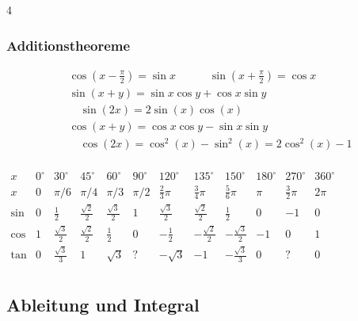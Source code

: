\documentclass[6pt,a4paper]{scrartcl}
\newcommand{\enbrace}[1]{\ensuremath{\left(#1\right)}}
\begin{document}
\begin{multicols*}{4}
\begin{sectionbox}
		\subsubsection{Additionstheoreme}
		\begin{eqnarray*}
			& \cos \enbrace{x - \frac{\pi}{2}} = \sin x \qquad \quad \sin \enbrace{x + \frac{\pi}{2}} = \cos x \\
			& \sin \enbrace{x + y} = \sin x \cos y + \cos x \sin y \\
			& \quad \sin (2x) = 2 \sin (x) \cos (x)        \\
			& \cos (x + y) = \cos x \cos y - \sin x \sin y \\
			& \quad \cos (2x) = \cos^2 (x) - \sin^2 (x) = 2\cos^2 (x) - 1\\
		\end{eqnarray*}
	\end{sectionbox}
	\hspace{-20pt}
	\scalebox{0.75}
	{
		$\begin{array}{c|c|c|c|c|c|c|c|c|c|c|c}
				x    & 0^{\circ} & 30^{\circ}         & 45^{\circ}         & 60^{\circ}        & 90^{\circ} & 120^{\circ}       & 135^{\circ}         & 150^{\circ}         & 180^{\circ} & 270^{\circ}    & 360^{\circ} \\ \hline
				x    & 0         & \pi / 6            & \pi / 4            & \pi / 3           & \pi / 2    & \frac{2}{3}\pi    & \frac{3}{4}\pi      & \frac{5}{6}\pi      & \pi         & \frac{3}{2}\pi & 2 \pi       \\ \hline
				\sin & 0         & \frac{1}{2}        & \frac{\sqrt{2}}{2} & \frac{\sqrt 3}{2} & 1          & \frac{\sqrt 3}{2} & \frac{\sqrt{2}}{2}  & \frac{1}{2}         & 0           & -1             & 0           \\
				\cos & 1         & \frac{\sqrt 3}{2}  & \frac{\sqrt{2}}{2} & \frac{1}{2}       & 0          & -\frac{1}{2}      & -\frac{\sqrt{2}}{2} & -\frac{\sqrt 3}{2}  & -1          & 0              & 1           \\
				\tan & 0         & \frac{\sqrt{3}}{3} & 1                  & \sqrt{3}          & ?          & -\sqrt{3}         & -1                  & -\frac{\sqrt{3}}{3} & 0           & ?              & 0           \\
			\end{array}$
	}

	\subsection{Ableitung und Integral}
	\begin{sectionbox}

\end{sectionbox}
\end{multicols*}
\end{document}
